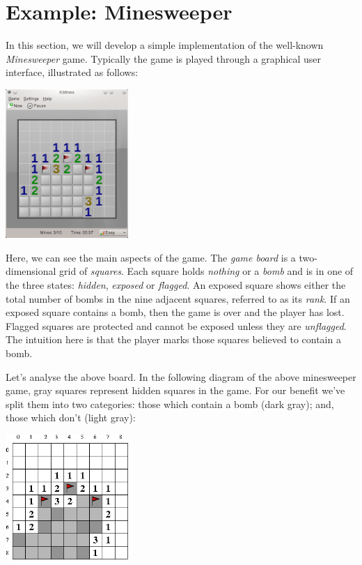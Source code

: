 \newpage
\section{Example: Minesweeper}
In this section, we will develop a simple implementation of the well-known {\em Minesweeper} game.  Typically the game is played through a graphical user interface, illustrated as follows:
\begin{center}
\includegraphics[width=0.35\textwidth]{../images/kmines.png}
\end{center}
Here, we can see the main aspects of the game.  The {\em game board} is a two-dimensional grid of {\em squares}.  Each square holds {\em nothing} or a {\em bomb} and is in one of the three states: {\em hidden}, {\em exposed} or {\em flagged}.  An exposed square shows either the total number of bombs in the nine adjacent squares, referred to as its {\em rank}.  If an exposed square contains a bomb, then the game is over and the player has lost.  Flagged squares are protected and cannot be exposed unless they are {\em unflagged}.  The intuition here is that the player marks those squares believed to contain a bomb.  

Let's analyse the above board.  In the following diagram of the above minesweeper game, gray squares represent hidden squares in the game.  For our benefit we've split them into two categories: those which contain a bomb (dark gray); and, those which don't (light gray): 

\begin{center}
\includegraphics[width=0.35\textwidth]{../images/kmines_analysis.png}
\end{center}

